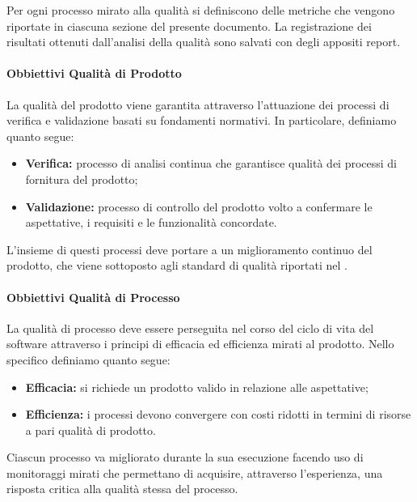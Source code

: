 	Per ogni processo mirato alla qualità si definiscono delle metriche che vengono riportate in ciascuna sezione del presente documento.
	La registrazione dei risultati ottenuti dall'analisi della qualità sono salvati con degli appositi report.

		\paragraph{Obbiettivi Qualità di Prodotto}

		La qualità del prodotto viene garantita attraverso l'attuazione dei processi di verifica e validazione basati su fondamenti normativi. In particolare, definiamo quanto segue:
		\begin{itemize}
			\item \textbf{Verifica:} processo di analisi continua che garantisce qualità dei processi di fornitura del prodotto;
			\item \textbf{Validazione:} processo di controllo del prodotto volto a confermare le aspettative, i requisiti e le funzionalità concordate.
		\end{itemize}

		L'insieme di questi processi deve portare a un miglioramento continuo del prodotto, che viene sottoposto agli standard di qualità riportati nel .

		\paragraph{Obbiettivi Qualità di Processo}

		La qualità di processo deve essere perseguita nel corso del ciclo di vita del software attraverso i principi di efficacia ed efficienza mirati al prodotto.
		Nello specifico definiamo quanto segue:
		\begin{itemize}
			\item \textbf{Efficacia:} si richiede un prodotto valido in relazione alle aspettative;
			\item \textbf{Efficienza:} i processi devono convergere con costi ridotti in termini di risorse a pari qualità di prodotto.
		\end{itemize}

		Ciascun processo va migliorato durante la sua esecuzione facendo uso di monitoraggi mirati che permettano di acquisire, attraverso l'esperienza, una risposta critica alla qualità stessa del processo. \\


